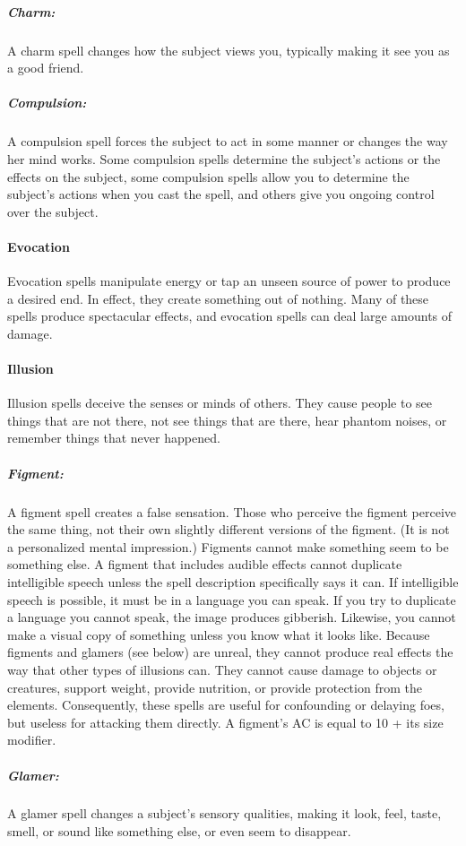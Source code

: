 \subparagraph{Charm:}
A charm spell changes how the subject views you, typically making it see you as a good friend.

\subparagraph{Compulsion:}
A compulsion spell forces the subject to act in some manner or changes the way her mind works. 
Some compulsion spells determine the subject's actions or the effects on the subject, 
some compulsion spells allow you to determine the subject's actions when you cast the spell, 
and others give you ongoing control over the subject.
\paragraph{Evocation}
Evocation spells manipulate energy or tap an unseen source of power to produce a desired end. 
In effect, they create something out of nothing. 
Many of these spells produce spectacular effects, and evocation spells can deal large amounts of damage.
\paragraph{Illusion}
Illusion spells deceive the senses or minds of others. 
They cause people to see things that are not there, not see things that are there, hear phantom noises, or remember things that never happened.

\subparagraph{Figment:}
A figment spell creates a false sensation. Those who perceive the figment perceive the same thing, 
not their own slightly different versions of the figment. (It is not a personalized mental impression.) 
Figments cannot make something seem to be something else. 
A figment that includes audible effects cannot duplicate intelligible speech unless the spell description specifically says it can. 
If intelligible speech is possible, it must be in a language you can speak. 
If you try to duplicate a language you cannot speak, the image produces gibberish. 
Likewise, you cannot make a visual copy of something unless you know what it looks like.
Because figments and glamers (see below) are unreal, they cannot produce real effects the way that other types of illusions can. 
They cannot cause damage to objects or creatures, support weight, provide nutrition, or provide protection from the elements. 
Consequently, these spells are useful for confounding or delaying foes, but useless for attacking them directly.
A figment's AC is equal to 10 + its size modifier.

\subparagraph{Glamer:}
A glamer spell changes a subject's sensory qualities, making it look, feel, taste, smell, or sound like something else, or even seem to disappear.

